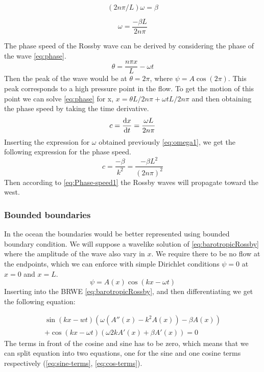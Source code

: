 \begin{equation}
    (2n\pi / L) \omega = \beta
\end{equation}

\begin{equation}\label{eq:omega1}
    \omega = \frac{-\beta L}{2n\pi}
\end{equation}

The phase speed of the Rossby wave can be derived by considering the phase of
the wave \cref{eq:phase}.
\begin{equation}\label{eq:phase}
    \theta = \frac{n \pi x}{L} - \omega t
\end{equation}
Then the peak of the wave would be at $\theta = 2\pi$, where $\psi = A\cos{(2\pi)}$.
This peak corresponds to a high pressure point in the flow. To get the motion of this point we can solve
\cref{eq:phase} for x, $x=\theta L / 2n \pi + \omega t L / 2n \pi$ and then
obtaining the phase speed by taking the time derivative.
\begin{equation}
    c = \dv{x}{t} = \frac{\omega L}{2n\pi}
\end{equation}
Inserting the expression for $\omega$ obtained previously \cref{eq:omega1}, we
get the following expression for the phase speed.
\begin{equation}\label{eq:Phase-speed1}
    c = \frac{-\beta}{k^2} = \frac{-\beta L^2}{(2n\pi)^2} 
\end{equation}
Then according to \cref{eq:Phase-speed1} the Rossby waves will propagate
toward the west.
\subsubsection{Bounded boundaries}
In the ocean the boundaries would be better represented using bounded boundary
condition. We will suppose a wavelike solution of \cref{eq:barotropicRossby}
where the amplitude of the wave also vary in $x$. We
require there to be no flow at the endpoints, which we can enforce with simple
Dirichlet conditions $\psi= 0$ at $x=0$ and $x=L$.
\begin{equation}\label{eq:waveSolution2}
    \psi = A(x)\cos{(kx-\omega t)}
\end{equation}
Inserting \label{eq:waveSolution2} into the BRWE
\cref{eq:barotropicRossby}, and then differentiating we get the following
equation:

\begin{equation}\label{eq:step1}
    \begin{split}
    \sin{(kx-wt)\left(\omega(A''(x)-k^2A(x))- \beta A(x)\right)} \\
    + \cos{(kx - \omega t)}\left(\omega 2kA'(x) +\beta A'(x)\right) = 0
    \end{split}
\end{equation}
The terms in front of the cosine and sine has to be zero, which means that we
can split equation into two equations, one for the sine and one cosine
terms respectively (\cref{eq:sine-terms}, \cref{eq:cos-terms}).

